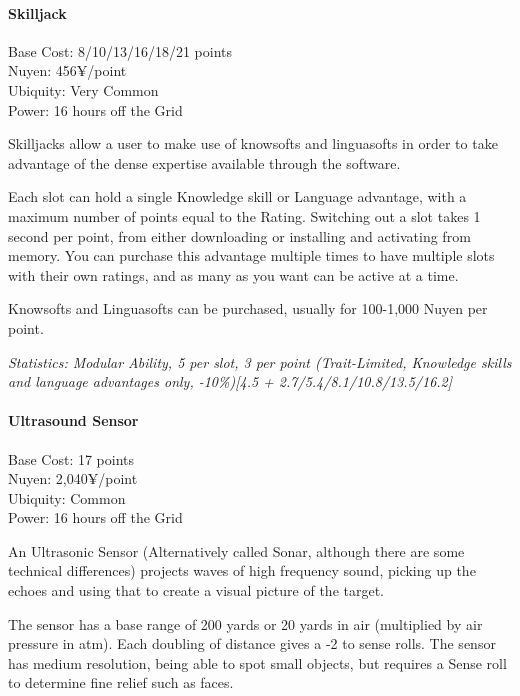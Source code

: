 \begin{multicols*}{3}
	\paragraph{Skilljack}
	\begin{flushright}
		Base Cost: 8/10/13/16/18/21 points\\
		Nuyen: 456¥/point\\
		Ubiquity: Very Common\\
		Power: 16 hours off the Grid\\
	\end{flushright}
	
	Skilljacks allow a user to make use of knowsofts and linguasofts in order to take advantage of the dense expertise available through the software. 
	
	Each slot can hold a single Knowledge skill or Language advantage, with a maximum number of points equal to the Rating. Switching out a slot takes 1 second per point, from either downloading or installing and activating from memory. You can purchase this advantage multiple times to have multiple slots with their own ratings, and as many as you want can be active at a time.
	
	Knowsofts and Linguasofts can be purchased, usually for 100-1,000 Nuyen per point.
	
	\textit{\textcolor{OliveGreen}{Statistics: Modular Ability, 5 per slot, 3 per point (Trait-Limited, Knowledge skills and language advantages only, -10\%)[4.5 + 2.7/5.4/8.1/10.8/13.5/16.2]}}
	
	\paragraph{Ultrasound Sensor}
	\begin{flushright}
		Base Cost: 17 points\\
		Nuyen: 2,040¥/point\\
		Ubiquity: Common\\
		Power: 16 hours off the Grid\\
	\end{flushright}
	
	An Ultrasonic Sensor (Alternatively called Sonar, although there are some technical differences) projects waves of high frequency sound, picking up the echoes and using that to create a visual picture of the target.
	
	The sensor has a base range of 200 yards or 20 yards in air (multiplied by air pressure in atm). Each doubling of distance gives a -2 to sense rolls. The sensor has medium resolution, being able to spot small objects, but requires a Sense roll to determine fine relief such as faces.
	

\end{multicols*}
